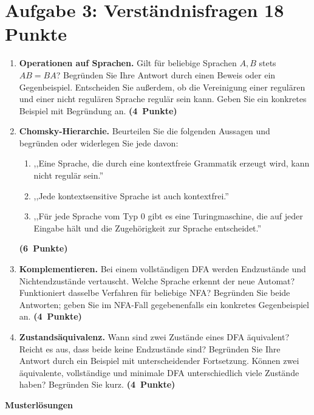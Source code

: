 \documentclass[11pt,a4paper]{article}
\newif\ifloesungen
\newcommand{\punkte}[1]{\hfill\mbox{\textbf{(#1 Punkte)}}}
\begin{document}
\section*{Aufgabe 3: Verständnisfragen \hfill 18 Punkte}
\begin{enumerate}[label=\alph*)]
\item \textbf{Operationen auf Sprachen.} Gilt für beliebige Sprachen $A,B$
stets $AB=BA$? Begründen Sie Ihre Antwort durch einen Beweis oder ein
Gegenbeispiel. Entscheiden Sie außerdem, ob die Vereinigung einer regulären
und einer nicht regulären Sprache regulär sein kann. Geben Sie ein
konkretes Beispiel mit Begründung an. \punkte{4}

\item \textbf{Chomsky-Hierarchie.} Beurteilen Sie die folgenden Aussagen
und begründen oder widerlegen Sie jede davon:
\begin{enumerate}[label=\roman*),itemsep=2pt]
\item ,,Eine Sprache, die durch eine kontextfreie Grammatik erzeugt wird,
kann nicht regulär sein.''
\item ,,Jede kontextsensitive Sprache ist auch kontextfrei.''
\item ,,Für jede Sprache vom Typ 0 gibt es eine Turingmaschine, die auf
jeder Eingabe hält und die Zugehörigkeit zur Sprache entscheidet.''
\end{enumerate}
\punkte{6}

\item \textbf{Komplementieren.} Bei einem vollständigen DFA werden
Endzustände und Nichtendzustände vertauscht. Welche Sprache erkennt der
neue Automat? Funktioniert dasselbe Verfahren für beliebige NFA?
Begründen Sie beide Antworten; geben Sie im NFA-Fall gegebenenfalls ein
konkretes Gegenbeispiel an. \punkte{4}

\item \textbf{Zustandsäquivalenz.} Wann sind zwei Zustände eines DFA
äquivalent? Reicht es aus, dass beide keine Endzustände sind?
Begründen Sie Ihre Antwort durch ein Beispiel mit unterscheidender
Fortsetzung. Können zwei äquivalente, vollständige und minimale DFA
unterschiedlich viele Zustände haben? Begründen Sie kurz. \punkte{4}
\end{enumerate}

\ifloesungen
\newpage
\begingroup\small
\setlength{\parskip}{4pt}
\begin{center}{\LARGE\bfseries Musterlösungen}\end{center}
\end{document}
